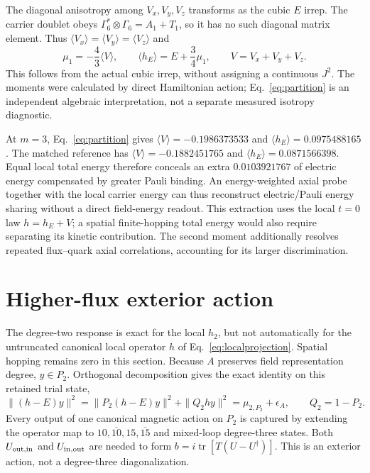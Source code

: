 \documentclass[11pt]{article}
\newcommand{\Tr}{\operatorname{tr}}
\newcommand{\Ga}{\Gamma}
\begin{document}
The diagonal anisotropy among $V_x,V_y,V_z$ transforms as the cubic $E$ irrep. The carrier doublet obeys $\Ga_6^*\otimes\Ga_6=A_1+T_1$, so it has no such diagonal matrix element. Thus $\langle V_x\rangle=\langle V_y\rangle=\langle V_z\rangle$ and
\begin{equation}
 \boxed{\mu_1=-\frac43\langle V\rangle,\qquad
 \langle h_E\rangle=E+\frac34\mu_1,\qquad V=V_x+V_y+V_z.} \label{eq:partition}
\end{equation}
This follows from the actual cubic irrep, without assigning a continuous $J^2$. The moments were calculated by direct Hamiltonian action; Eq.~\eqref{eq:partition} is an independent algebraic interpretation, not a separate measured isotropy diagnostic.

At $m=3$, Eq.~\eqref{eq:partition} gives $\langle V\rangle=-0.1986373533$ and $\langle h_E\rangle=0.0975488165$. The matched reference has $\langle V\rangle=-0.1882451765$ and $\langle h_E\rangle=0.0871566398$. Equal local total energy therefore conceals an extra $0.0103921767$ of electric energy compensated by greater Pauli binding. An energy-weighted axial probe together with the local carrier energy can thus reconstruct electric/Pauli energy sharing without a direct field-energy readout. This extraction uses the local $t=0$ law $h=h_E+V$; a spatial finite-hopping total energy would also require separating its kinetic contribution. The second moment additionally resolves repeated flux--quark axial correlations, accounting for its larger discrimination.

\section{Higher-flux exterior action}
The degree-two response is exact for the local $h_2$, but not automatically for the untruncated canonical local operator $h$ of Eq.~\eqref{eq:localprojection}. Spatial hopping remains zero in this section. Because $A$ preserves field representation degree, $y\in P_2$. Orthogonal decomposition gives the exact identity on this retained trial state,
\begin{equation}
 \|(h-E)y\|^2=\|P_2(h-E)y\|^2+\|Q_2hy\|^2
 =\mu_{2,P_2}+\epsilon_A,\qquad Q_2=1-P_2. \label{eq:exterior}
\end{equation}
Every output of one canonical magnetic action on $P_2$ is captured by extending the operator map to $10,\overline{10},15,\overline{15}$ and mixed-loop degree-three states. Both $U_{\rm out,in}$ and $U_{\rm in,out}$ are needed to form $b=i\Tr[T(U-U^\dagger)]$. This is an exterior action, not a degree-three diagonalization.
\end{document}
